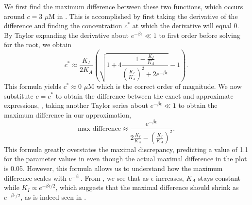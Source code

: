 We first find the maximum difference between these two functions, which occurs
around $c = 3\,\,\mu\text{M}$ in \fref[SIfig6]. This is accomplished by first
taking the derivative of the difference and finding the concentration $c^*$ at
which the derivative will equal 0. By Taylor expanding the derivative about
$e^{- \beta \epsilon} \ll 1$ to first order before solving for the root, we
obtain
\begin{equation}
c^* \approx \frac{K_I}{2 K_A} \left( \sqrt{1+4\frac{1-\frac{K_I}{K_A}}{\left( \frac{K_I}{K_A} \right)^2 + 2 e^{- \beta \epsilon}}} - 1 \right).
\end{equation}
This formula yields $c^* \approx 0\,\,\mu\text{M}$ which is the correct order of
magnitude. We now substitute $c=c^*$ to obtain the difference between the exact
and approximate expressions, \eref[eqSIstep2][eqSIstep3], taking another Taylor
series about $e^{- \beta \epsilon} \ll 1$ to obtain the maximum difference in
our approximation,
\begin{equation}
\text{max difference} \approx \frac{e^{- \beta \epsilon}}{2 \frac{K_I}{K_A} - \left( \frac{K_I}{K_A} \right)^2}.
\end{equation}
This formula greatly overstates the maximal discrepancy, predicting a value of
1.1 for the parameter values in \fref[SIfig6] even though the actual
maximal difference in the plot is 0.05. However, this formula allows us to
understand how the maximum difference scales with $e^{- \beta \epsilon}$. From
\fref[SIfig5], we see that as $\epsilon$ increases, $K_A$ stays
constant while $K_I \propto e^{-\beta \epsilon/2}$, which suggests that the
maximal difference should shrink as $e^{-\beta \epsilon/2}$, as is indeed seen
in \fref[SIfig6].


